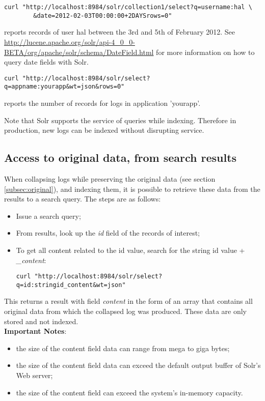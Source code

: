 \documentclass[twoside,11pt]{article}
\begin{document}
\begin{verbatim}
curl "http://localhost:8984/solr/collection1/select?q=username:hal \
        &date=2012-02-03T00:00:00+2DAYSrows=0"
\end{verbatim}
reports records of user hal between the 3rd and 5th of February 2012. See \url{http://lucene.apache.org/solr/api-4_0_0-BETA/org/apache/solr/schema/DateField.html} for more information on how to query date fields with Solr.

\begin{verbatim}
curl "http://localhost:8984/solr/select?q=appname:yourapp&wt=json&rows=0"
\end{verbatim}
reports the number of records for logs in application 'yourapp'.

Note that Solr supports the service of queries while indexing. Therefore in production, new logs can be indexed without disrupting service.

\subsection{Access to original data, from search results}
When collapsing logs while preserving the original data (see section \ref{subsec:original}), and indexing them, it is possible to retrieve these data from the results to a search query. The steps are as follows:

\begin{itemize}
\item Issue a search query;
\item From results, look up the \emph{id} field of the records of interest;
\item To get all content related to the id value, search for the string id value + \emph{\_content}:

\begin{verbatim}
curl "http://localhost:8984/solr/select?q=id:stringid_content&wt=json"
\end{verbatim}
\end{itemize}

This returns a result with field \emph{content} in the form of an array that contains all original data from which the collapsed log was produced. These data are only stored and not indexed.\\

{\bf Important Notes}:
\begin{itemize}
\item the size of the content field data can range from mega to giga bytes;
\item the size of the content field data can exceed the default output buffer of Solr's Web server;
\item the size of the content field can exceed the system's in-memory capacity.
\end{itemize}
\end{document}
